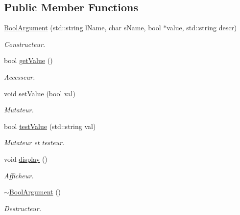 \subsection*{Public Member Functions}
\begin{DoxyCompactItemize}
\item 
\hyperlink{classBoolArgument_aac57d1e4e57f45c6786509ff36f8d274}{Bool\-Argument} (std\-::string l\-Name, char s\-Name, bool $\ast$value, std\-::string descr)
\begin{DoxyCompactList}\small\item\em Constructeur. \end{DoxyCompactList}\item 
bool \hyperlink{classBoolArgument_af51f23cede522a86230b190877d16170}{get\-Value} ()
\begin{DoxyCompactList}\small\item\em Accesseur. \end{DoxyCompactList}\item 
void \hyperlink{classBoolArgument_a7b7c18ef5aee456259062262695dcaa5}{set\-Value} (bool val)
\begin{DoxyCompactList}\small\item\em Mutateur. \end{DoxyCompactList}\item 
bool \hyperlink{classBoolArgument_ad4c0bd190cf554294e07d4ad3194308e}{test\-Value} (std\-::string val)
\begin{DoxyCompactList}\small\item\em Mutateur et testeur. \end{DoxyCompactList}\item 
void \hyperlink{classBoolArgument_a458a678ce4c52055f2c09132b49a0aca}{display} ()
\begin{DoxyCompactList}\small\item\em Afficheur. \end{DoxyCompactList}\item 
\hyperlink{classBoolArgument_a195c1bab8f3e69db0d6170caebced29d}{$\sim$\-Bool\-Argument} ()
\begin{DoxyCompactList}\small\item\em Destructeur. \end{DoxyCompactList}\end{DoxyCompactItemize}


